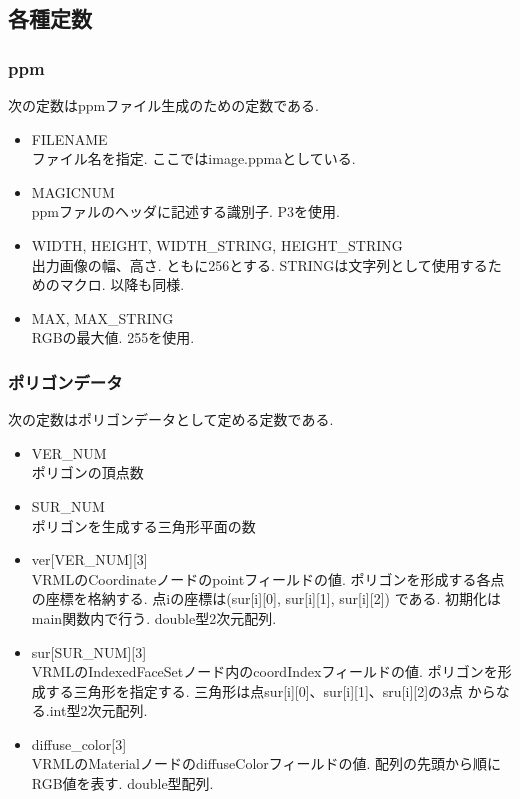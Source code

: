 \documentclass[a4j,dvipdfmx]{jsarticle}
\begin{document}
\subsection{各種定数}
\subsubsection{ppm}
次の定数はppmファイル生成のための定数である.
\begin{itemize}
\item FILENAME\\
  ファイル名を指定. ここではimage.ppmaとしている.
  
\item MAGICNUM\\
  ppmファルのヘッダに記述する識別子. P3を使用.
  
\item WIDTH, HEIGHT, WIDTH\_STRING, HEIGHT\_STRING\\
  出力画像の幅、高さ. ともに256とする. STRINGは文字列として使用するためのマクロ.
  以降も同様.
  
\item MAX, MAX\_STRING\\
  RGBの最大値. 255を使用.

\end{itemize}

\subsubsection{ポリゴンデータ}
次の定数はポリゴンデータとして定める定数である.
\begin{itemize}
\item VER\_NUM\\
  ポリゴンの頂点数
  
\item SUR\_NUM\\
  ポリゴンを生成する三角形平面の数
  
\item ver[VER\_NUM][3]\\
  VRMLのCoordinateノードのpointフィールドの値.
  ポリゴンを形成する各点の座標を格納する.
  点iの座標は(sur[i][0], sur[i][1], sur[i][2])
  である. 初期化はmain関数内で行う.
  double型2次元配列.
  
\item sur[SUR\_NUM][3]\\
  VRMLのIndexedFaceSetノード内のcoordIndexフィールドの値.
  ポリゴンを形成する三角形を指定する.
  三角形は点sur[i][0]、sur[i][1]、sru[i][2]の3点
  からなる.int型2次元配列.
  
\item diffuse\_color[3]\\
  VRMLのMaterialノードのdiffuseColorフィールドの値.
  配列の先頭から順にRGB値を表す.
  double型配列.
\end{itemize}
\end{document}
